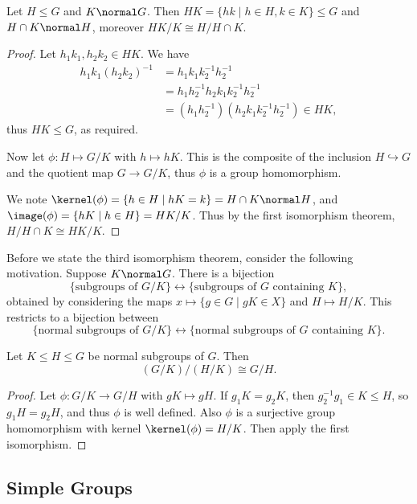 \documentclass[a4paper]{scrartcl}
\begin{document}
\begin{corollary}
	Let $H \leq G$ and $K \normal G$. Then $HK = \{hk \mid h \in H, k \in K \} \leq G$ and $H \cap K \normal H$, moreover $HK/K \cong H/H \cap K$.
\end{corollary}
\begin{proof}
	Let $h_1 k_1, h_2 k_2 \in HK$. We have
	\begin{align*}
		h_1 k_1 (h_2 k_2)^{-1} &= h_1 k_1 k_2^{-1} h_2^{-1} \\&= h_1 h_2^{-1} h_2 k_1 k_2^{-1} h_2^{-1} \\&= (h_1 h_2^{-1}) (h_2 k_1 k_2^{-1} h_2^{-1}) \in HK,
	\end{align*}
	thus $HK \leq G$, as required.

	Now let $\phi:H \mapsto G/K$ with $h \mapsto hK$. This is the composite of the inclusion $H \hookrightarrow G$ and the quotient map $G \rightarrow G/K$, thus $\phi$ is a group homomorphism.

	We note $\kernel(\phi) = \{h \in H \mid hK = k\} = H \cap K \normal H$, and $\image(\phi) =\{hK \mid h \in H \} = HK / K$. Thus by the first isomorphism theorem,
	$
	H/H \cap K \cong HK/K.
	$
\end{proof}

Before we state the third isomorphism theorem, consider the following motivation. Suppose $K \normal G$. There is a bijection
$$
\{\text{subgroups of } G/K \} \longleftrightarrow \{ \text{subgroups of } G \text{ containing }K \},
$$
obtained by considering the maps $x \mapsto \{g \in G \mid gK \in X \}$ and $H \mapsto H/K$. This restricts to a bijection between 
$$
\{\text{normal subgroups of }G/K \} \longleftrightarrow \{\text{normal subgroups of }G\text{ containing }K\}.
$$

\begin{corollary}
	Let $K \leq H \leq G$ be normal subgroups of $G$. Then
	$$
	(G/K) / (H/K) \cong G/H.
	$$
\end{corollary}
\begin{proof}
	Let $\phi: G/K \rightarrow G/H$ with $gK \mapsto gH$. If $g_1K = g_2 K$, then $g_2^{-1}g_1 \in K \leq H$, so $g_1 H = g_2 H$, and thus $\phi$ is well defined. Also $\phi$ is a surjective group homomorphism with kernel $\kernel(\phi) = H/K$. Then apply the first isomorphism.
\end{proof}

\subsection{Simple Groups}
\end{document}
